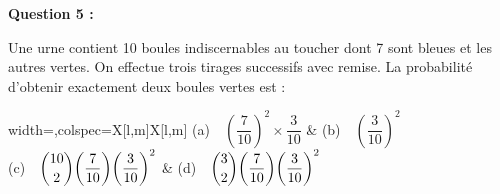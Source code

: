 \bigskip

\textbf{Question 5 :}

\medskip

Une urne contient 10 boules indiscernables au toucher dont 7 sont bleues et les autres vertes. On effectue trois tirages successifs avec remise. La probabilité d'obtenir exactement deux boules vertes est : 

\medskip

\begin{tblr}{width=\linewidth,colspec={X[l,m]X[l,m]}}%
	(a)~~${\left(\dfrac{7}{10}\right)}^2 \times \dfrac{3}{10}$ &
	(b)~~${\left(\dfrac{3}{10}\right)}^2$ \\
	(c)~~$\dbinom{10}{2} {\left(\dfrac{7}{10}\right)} {\left(\dfrac{3}{10}\right)}^2$ &
	(d)~~$\dbinom{3}{2} {\left(\dfrac{7}{10}\right)} {\left(\dfrac{3}{10}\right)}^2$
\end{tblr}

